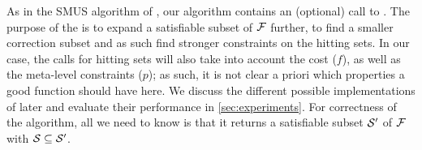 As in the SMUS algorithm of \citet{ignatiev2015smallest}, our algorithm contains an (optional) call to \grow. 
The purpose of the \grow is to expand a satisfiable subset of $\mathcal{F}$ further, to find a smaller correction subset and as such find stronger constraints on the hitting sets. 
In our case, the calls for hitting sets will also take into account the cost ($f$), as well as the meta-level constraints ($p$); as such, it is not clear a priori which properties a good \grow function should have here.
We discuss the different possible implementations of \grow later and evaluate their performance in \cref{sec:experiments}. For correctness of the algorithm, all we need to know is that it returns a satisfiable subset $\mathcal{S}'$ of $\mathcal{F}$ with $\mathcal{S}\subseteq\mathcal{S}'$.
%


